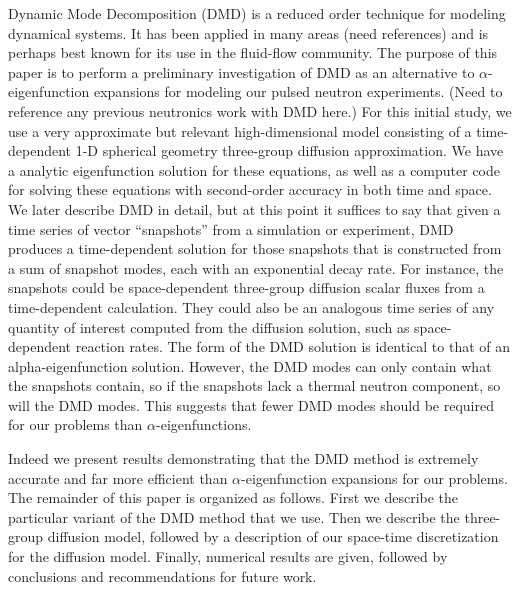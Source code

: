 \documentclass[12pt]{article}
\begin{document}
Dynamic Mode Decomposition (DMD) is a reduced order technique for modeling dynamical systems.  It has been applied 
in many areas (need references) and is perhaps best known for its use in the fluid-flow community.  The purpose of 
this paper is to perform a preliminary investigation of DMD as an alternative to $\alpha$-eigenfunction expansions 
for modeling our pulsed neutron experiments. (Need to reference any previous neutronics work with DMD here.) 
For this initial study, we use a very approximate but relevant 
high-dimensional model consisting of a time-dependent 1-D spherical geometry three-group diffusion approximation. 
We have a analytic eigenfunction solution for these equations, as well as a computer code for solving 
these equations with second-order accuracy in both time and space.  We later describe DMD in detail, but at 
this point it suffices to say that given a time series of vector ``snapshots'' from a simulation or experiment, 
DMD produces a time-dependent solution for those snapshots that is constructed from a sum of snapshot modes, each with 
an exponential decay rate.  For instance, the snapshots could be space-dependent three-group diffusion scalar fluxes 
from a time-dependent calculation.  They could also be an analogous time series of any quantity of interest computed 
from the diffusion solution, such as space-dependent reaction rates.  The form of the DMD solution is identical to that 
of an alpha-eigenfunction solution.  However, the DMD modes can only contain what the snapshots contain, so if the snapshots 
lack a thermal neutron component, so will the DMD modes.  This suggests that fewer DMD modes should be required for 
our problems than $\alpha$-eigenfunctions.

Indeed we present results demonstrating that the DMD method is extremely accurate and far more efficient than 
$\alpha$-eigenfunction expansions for our problems.  The remainder of this paper is organized as follows.  First we describe 
the particular variant of the DMD method that we use.  Then we describe the three-group diffusion model, followed by a 
description of our space-time discretization for the diffusion model.  Finally, numerical results are given, followed by 
conclusions and recommendations for future work.
\end{document}
